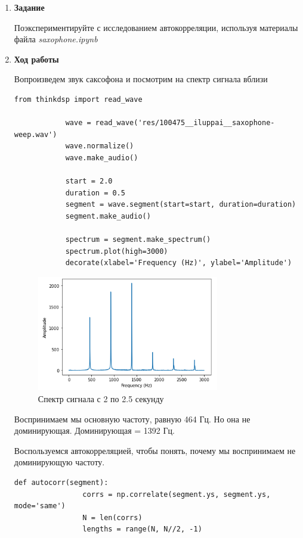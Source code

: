 \documentclass[a4paper,12pt]{article}
\begin{document}
	\begin{enumerate}
		
		
		\item \textbf{Задание}
		
		Поэкспериментируйте с исследованием автокорреляции, используя материалы файла \textit{saxophone.ipynb}
		
		\item \textbf{Ход работы}
		
		Вопроизведем звук саксофона и посмотрим на спектр сигнала вблизи
		\begin{lstlisting}[caption=Работа со звуком]
			from thinkdsp import read_wave
			
			wave = read_wave('res/100475__iluppai__saxophone-weep.wav')
			wave.normalize()
			wave.make_audio()
			
			start = 2.0
			duration = 0.5
			segment = wave.segment(start=start, duration=duration)
			segment.make_audio()
			
			spectrum = segment.make_spectrum()
			spectrum.plot(high=3000)
			decorate(xlabel='Frequency (Hz)', ylabel='Amplitude')
		\end{lstlisting}
		\begin{figure}[H]
			\centering
			\includegraphics[width=0.75\textwidth]{4_1.png}
			\caption{Спектр сигнала с 2 по 2.5 секунду}
			\label{fig:4.1}
		\end{figure}
	
		Воспринимаем мы основную частоту, равную 464 Гц. Но она не доминирующая. Доминирующая = 1392 Гц.
		
		Воспользуемся автокорреляцией, чтобы понять, почему мы воспринимаем не доминирующую частоту.
		
		\begin{lstlisting}[caption=Автокоррелируем]
			def autocorr(segment):
				corrs = np.correlate(segment.ys, segment.ys, mode='same')
				N = len(corrs)
				lengths = range(N, N//2, -1)
				

\end{lstlisting}
\end{enumerate}
\end{document}
